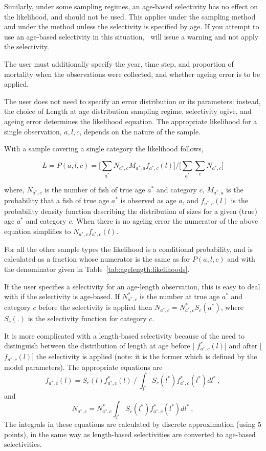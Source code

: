 Similarly, under some sampling regimes, an age-based selectivity has no effect on the likelihood, and should not be used. This applies under the  sampling method and under the  method unless the selectivity is specified by age. If you attempt to use an age-based selectivity in this situation, \CNAME\ will issue a warning and not apply the selectivity. 

The user must additionally specify the year, time step, and proportion of mortality when the observations were collected, and whether ageing error is to be applied. 


The user does not need to specify an error distribution or its parameters: instead, the choice of Length at age distribution sampling regime, selectivity ogive, and ageing error determines the likelihood equation. The appropriate likelihood for a single observation, \(a,l,c\), depends on the nature of the sample. 


With a  sample covering a single category the likelihood follows,

\[
L = P(a,l,c) = \bigg[\sum_{a^*} N_{a^*,c}M_{a^*,a}f_{a^*,c}(l)\bigg] / \bigg[\sum_{a^*}\sum_{c} N_{a^*,c}\bigg]
\]

where, \(N_{a^*,c}\) is the number of fish of true age \(a^*\) and category \(c\), \(M_{a^*,a}\) is the probability that a fish of true age \(a^*\) is observed as age \(a\), and \(f_{a^*,c}(l)\) is the probability density function describing the distribution of sizes for a given (true) age \(a^*\) and category \(c\). When there is no ageing error the numerator of the above equation simplifies to \(N_{a^*,c}f_{a^*,c}(l)\).

For all the other sample types the likelihood is a conditional probability, and is calculated as a fraction whose numerator is the same as for \(P(a,l,c) \) and with the denominator given in Table~\ref{tab:agelength:likelihoods}.


If the user specifies a selectivity for an age-length observation, this is easy to deal with if the
selectivity is age-based. If \(N^*_{a^*,c}\) is the number at true age \(a^*\) and category \(c\) before the selectivity is applied then \(N_{a^*,c} = N^*_{a^*,c}S_c(a^*)\), where \(S_c(.)\) is the selectivity function for category \(c\).

It is more complicated with a length-based selectivity because of the need to distinguish
between the distribution of length at age before [ \(f^*_{a^*,c}(l)\)] and after [\(f_{a^*,c}(l)\)] the selectivity is applied (note: it is the former which is defined by the model parameters). The appropriate
equations are
\[
f_{a^*,c}(l) = S_c(l)f^*_{a^*,c}(l) \ / \ \int_{l^*} S_c(l^*)f^*_{a^*,c}(l^*) dl^* \ ,
\]
and 
\[
N_{a^*,c} = N^*_{a^*,c} \int_{l^*} S_c(l^*)f^*_{a^*,c}(l^*) dl^* \ ,
\]
The integrals in these equations are calculated by discrete approximation (using 5 points), in
the same way as length-based selectivities are converted to age-based selectivities.

